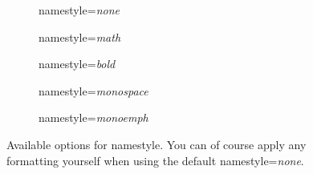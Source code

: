 \documentclass[headings=normal]{scrartcl}
\begin{document}
\begin{figure}[!ht]
    \begin{subfigure}{0.32\textwidth}
        \centering
        \begin{af}[namestyle=none]
    
        \end{af}
        \caption{\textsf{namestyle}=\textit{none}}
        \label{fig:namestyle_none}
    \end{subfigure}
    \hfill
    \begin{subfigure}{0.32\textwidth}
        \centering
        \begin{af}[namestyle=math]
    
        \end{af}
        \caption{\textsf{namestyle}=\textit{math}}
        \label{fig:namestyle_math}
    \end{subfigure}
    \hfill
    \begin{subfigure}{0.32\textwidth}
        \centering
        \begin{af}[namestyle=bold]
    
        \end{af}
        \caption{\textsf{namestyle}=\textit{bold}}
        \label{fig:namestyle_bold}
    \end{subfigure}
    \hfill
    \par\bigskip
    \begin{subfigure}{0.49\textwidth}
        \centering
        \begin{af}[namestyle=monospace]
    
        \end{af}
        \caption{\textsf{namestyle}=\textit{monospace}}
        \label{fig:namestyle_monospace}
    \end{subfigure}
    \hfill
    \begin{subfigure}{0.49\textwidth}
        \centering
        \begin{af}[namestyle=monoemph]
    
        \end{af}
        \caption{\textsf{namestyle}=\textit{monoemph}}
        \label{fig:namestyle_monoemph}
    \end{subfigure}
    \caption{Available options for \textsf{namestyle}. You can of course apply any formatting yourself when using the default \textsf{namestyle}=\textit{none}.}
    \label{fig:namestyle}
\end{figure}
\end{document}
